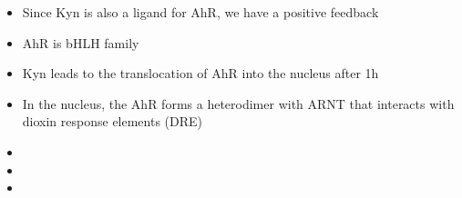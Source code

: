 \documentclass{article}
\begin{document}
\begin{itemize}
        \item Since Kyn is also a ligand for AhR, we have a positive feedback \cite{opitz2011endogenous}
        \item AhR is bHLH family
        \item Kyn leads to the translocation of AhR into the nucleus after 1h \cite{opitz2011endogenous}
        \item In the nucleus, the AhR forms a heterodimer with ARNT that interacts with dioxin response elements (DRE) \cite{opitz2011endogenous}
        \item
        \item
        \item
    \end{itemize}

\end{document}
